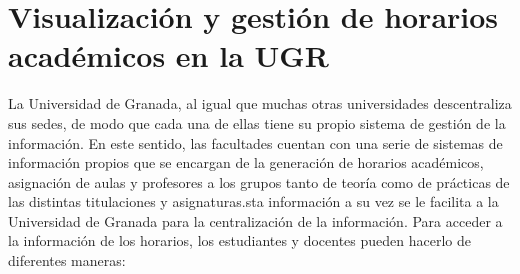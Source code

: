 \section{Visualización y gestión de horarios académicos en la UGR}

La Universidad de Granada, al igual que muchas otras universidades descentraliza sus sedes, de modo que
cada una de ellas tiene su propio sistema de gestión de la información. En este sentido, las facultades cuentan
con una serie de sistemas de información propios que se encargan de la generación de horarios académicos,
asignación de aulas y profesores a los grupos tanto de teoría como de prácticas 
de las distintas titulaciones y asignaturas.sta información a su vez se le facilita a la Universidad de Granada para la centralización de la información.
\newline\newline
Para acceder a la información de los horarios, los estudiantes y docentes pueden hacerlo de diferentes maneras:
